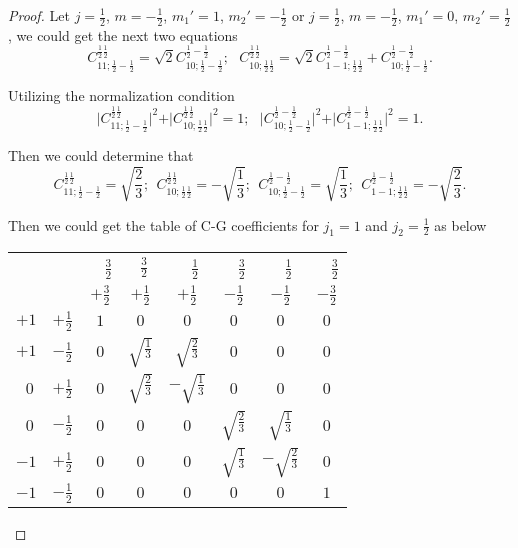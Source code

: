 \documentclass[reqno,a4paper,12pt]{amsart}
\begin{document}
\begin{enumerate}[1.]
\begin{proof}
	Let $j = \frac{1}{2}$, $m = -\frac{1}{2}$, $m_1' = 1$, $m_2' = -\frac{1}{2}$ or $j = \frac{1}{2}$, $m = -\frac{1}{2}$, $m_1' = 0$, $m_2' = \frac{1}{2}$, we could get the next two equations 
	\[
		C_{11;\frac{1}{2}-\frac{1}{2}}^{\frac{1}{2}\frac{1}{2}} = \sqrt{2} C_{10;\frac{1}{2}-\frac{1}{2}}^{\frac{1}{2}-\frac{1}{2}}; \ \ \
		C_{10;\frac{1}{2}\frac{1}{2}}^{\frac{1}{2}\frac{1}{2}} = \sqrt{2} C_{1-1;\frac{1}{2}\frac{1}{2}}^{\frac{1}{2}-\frac{1}{2}} + C_{10;\frac{1}{2}-\frac{1}{2}}^{\frac{1}{2} -\frac{1}{2}}.
	\]
	
	Utilizing the normalization condition 
	\[
		\vert C_{11;\frac{1}{2}-\frac{1}{2}}^{\frac{1}{2}\frac{1}{2}} \vert^2 + \vert C_{10;\frac{1}{2}\frac{1}{2}}^{\frac{1}{2}\frac{1}{2}} \vert^2 = 1; \ \ \
		\vert C_{10;\frac{1}{2}-\frac{1}{2}}^{\frac{1}{2}-\frac{1}{2}} \vert^2 + \vert C_{1-1;\frac{1}{2}\frac{1}{2}}^{\frac{1}{2}-\frac{1}{2}} \vert^2 = 1.
	\]
	
	Then we could determine that 
	\[
		C_{11;\frac{1}{2}-\frac{1}{2}}^{\frac{1}{2}\frac{1}{2}} = \sqrt{\frac{2}{3}}; \ \ C_{10;\frac{1}{2}\frac{1}{2}}^{\frac{1}{2}\frac{1}{2}} = -\sqrt{\frac{1}{3}}; \ \ C_{10;\frac{1}{2}-\frac{1}{2}}^{\frac{1}{2}-\frac{1}{2}} = \sqrt{\frac{1}{3}}; \ \ C_{1-1;\frac{1}{2}\frac{1}{2}}^{\frac{1}{2}-\frac{1}{2}} = -\sqrt{\frac{2}{3}}.
	\]
	
	Then we could get the table of C-G coefficients for $j_1=1$ and $j_2 = \frac{1}{2}$ as below 
	\begin{table}[!ht]
	\centering
	\begin{tabular}{|cc|c|cc|cc|c|}
	\hline
	 & &\ \ $\frac{3}{2}$ & $\ \ \frac{3}{2}$ &\ \ $\frac{1}{2}$ &\ \ $\frac{3}{2}$ &\ \ $\frac{1}{2}$ &\ \ $\frac{3}{2}$ \\ %
	 & & $+\frac{3}{2}$ & $+\frac{1}{2}$ & $+\frac{1}{2}$ & $-\frac{1}{2}$ & $-\frac{1}{2}$ & $-\frac{3}{2}$ \\
	\hline
	$+1$ & $+\frac{1}{2}$ & $1$ & $0$ & $0$ & $0$ & $0$ & $0$ \\
	\hline
	$+1$ & $-\frac{1}{2}$ & $0$ & $\sqrt{\frac{1}{3}}$ & $\sqrt{\frac{2}{3}}$ & $0$ & $0$ & $0$ \\
	$\ \ 0$ & $+\frac{1}{2}$ & $0$ & $\sqrt{\frac{2}{3}}$ & $-\sqrt{\frac{1}{3}}$ & $0$ & $0$ & $0$ \\
	\hline
	$\ \ 0$ & $-\frac{1}{2}$ & $0$ & $0$ & $0$ & $\sqrt{\frac{2}{3}}$ & $\sqrt{\frac{1}{3}}$ & $0$ \\
	$-1$ & $+\frac{1}{2}$ & $0$ & $0$ & $0$ & $\sqrt{\frac{1}{3}}$ & $-\sqrt{\frac{2}{3}}$ & $0$ \\  
	\hline
	$-1$ & $-\frac{1}{2}$ & $0$ & $0$ & $0$ & $0$ & $0$ & $1$ \\
	\hline
	\end{tabular}
	\end{table}
	

\end{proof}
\end{enumerate}
\end{document}
